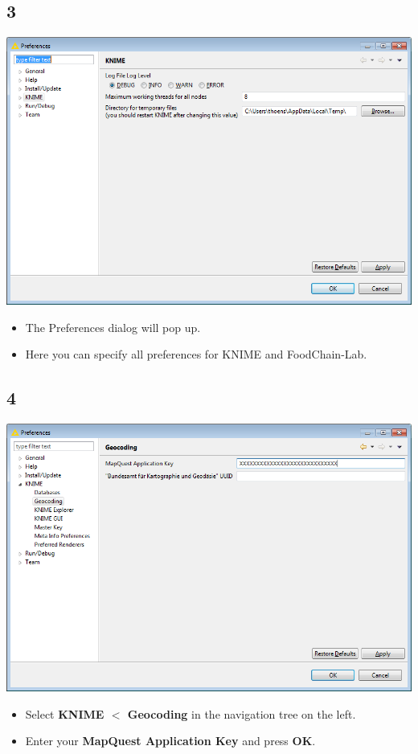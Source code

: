 \documentclass{beamer}
\begin{document}
\subsection{3}
\begin{frame}
	\begin{center}
  		\includegraphics[height=0.6\textheight]{3.png}
	\end{center}
	\begin{itemize}
		\item The Preferences dialog will pop up.
		\item Here you can specify all preferences for KNIME and FoodChain-Lab.
	\end{itemize}
\end{frame}

\subsection{4}
\begin{frame}
	\begin{center}
  		\includegraphics[height=0.6\textheight]{4.png}
	\end{center}
	\begin{itemize}
		\item Select \textbf{KNIME $<$ Geocoding} in the navigation tree on the left.
		\item Enter your \textbf{MapQuest Application Key} and press \textbf{OK}.
	\end{itemize}
\end{frame}
\end{document}
